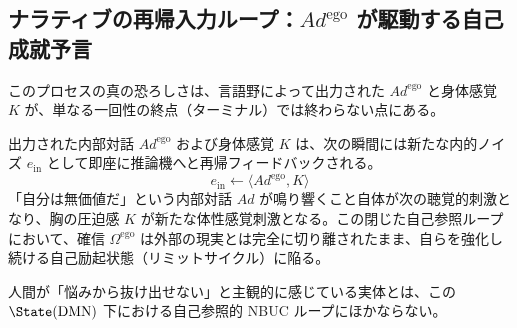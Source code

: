 
\subsection{ナラティブの再帰入力ループ：$Ad^{\mathrm{ego}}$ が駆動する自己成就予言}

このプロセスの真の恐ろしさは、言語野によって出力された $Ad^{\mathrm{ego}}$ と身体感覚 $K$ が、単なる一回性の終点（ターミナル）では終わらない点にある。

出力された内部対話 $Ad^{\mathrm{ego}}$ および身体感覚 $K$ は、次の瞬間には新たな内的ノイズ $e_{\mathrm{in}}$ として即座に推論機へと再帰フィードバックされる。
\begin{equation}
    e_{\mathrm{in}} \leftarrow \langle Ad^{\mathrm{ego}}, K \rangle
\end{equation}
「自分は無価値だ」という内部対話 $Ad$ が鳴り響くこと自体が次の聴覚的刺激となり、胸の圧迫感 $K$ が新たな体性感覚刺激となる。この閉じた自己参照ループにおいて、確信 $\Omega^{\mathrm{ego}}$ は外部の現実とは完全に切り離されたまま、自らを強化し続ける自己励起状態（リミットサイクル）に陥る。

人間が「悩みから抜け出せない」と主観的に感じている実体とは、この $\State(\mathrm{DMN})$ 下における自己参照的 NBUC ループにほかならない。

